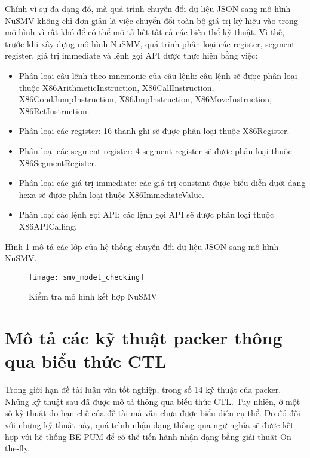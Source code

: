 \hspace{0.5cm}Chính vì sự đa dạng đó, mà quá trình chuyển đổi dữ liệu JSON sang mô hình NuSMV không chỉ đơn giản là việc chuyển đổi toàn bộ giá trị ký hiệu vào trong mô hình vì rất khó để có thể mô tả hết tất cả các biến thể kỹ thuật. Vì thế, trước khi xây dựng mô hình NuSMV, quá trình phân loại các register, segment register, giá trị immediate và lệnh gọi API được thực hiện bằng việc:

\begin{itemize}
\item{Phân loại câu lệnh theo mnemonic của câu lệnh: câu lệnh sẽ được phân loại thuộc X86ArithmeticInstruction, X86CallInstruction, X86CondJumpInstruction, X86JmpInstruction, X86MoveInstruction, X86RetInstruction.}
\item{Phân loại các register: 16 thanh ghi sẽ được phân loại thuộc X86Register.}
\item{Phân loại các segment register: 4 segment register sẽ được phân loại thuộc X86SegmentRegister.}
\item{Phân loại các giá trị immediate: các giá trị constant được biểu diễn dưới dạng hexa sẽ được phân loại thuộc X86ImmediateValue.}
\item{Phân loại các lệnh gọi API: các lệnh gọi API sẽ được phân loại thuộc X86APICalling.}
\end{itemize}

\hspace{0.5cm}Hình \ref {fig:SMVModelChecking} mô tả các lớp của hệ thống chuyển đổi dữ liệu JSON sang mô hình NuSMV.

\begin{figure}
\centering
\texttt{[image: smv\_model\_checking]}
\caption{Kiểm tra mô hình kết hợp NuSMV}
\label{fig:SMVModelChecking}
\end{figure}

\section{Mô tả các kỹ thuật packer thông qua biểu thức CTL}

\hspace{0.5cm}Trong giới hạn đề tài luận văn tốt nghiệp, trong số 14 kỹ thuật của packer. Những kỹ thuật sau đã được mô tả thông qua biểu thức CTL. Tuy nhiên, ở một số kỹ thuật do hạn chế của đề tài mà vẫn chưa được biểu diễn cụ thể. Do đó đối với những kỹ thuật này, quá trình nhận dạng thông qua ngữ nghĩa sẽ được kết hợp với hệ thống BE-PUM để có thể tiến hành nhận dạng bằng giải thuật On-the-fly.\\

